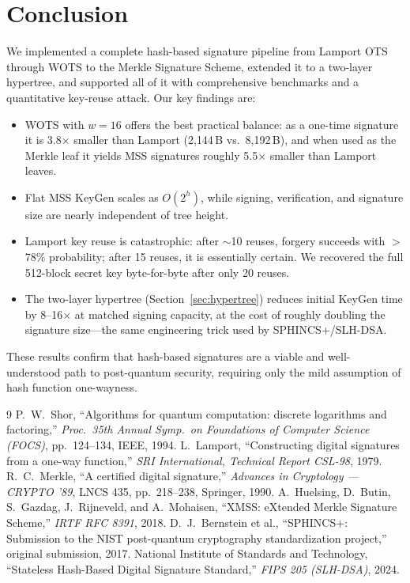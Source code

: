 \documentclass[10pt,a4paper,twocolumn]{article}
\begin{document}
\section{Conclusion}

We implemented a complete hash-based signature pipeline from Lamport OTS through WOTS to the Merkle Signature Scheme, extended it to a two-layer hypertree, and supported all of it with comprehensive benchmarks and a quantitative key-reuse attack. Our key findings are:

\begin{itemize}
    \item WOTS with $w\!=\!16$ offers the best practical balance: as a one-time signature it is 3.8$\times$ smaller than Lamport (2{,}144\,B vs.\ 8{,}192\,B), and when used as the Merkle leaf it yields MSS signatures roughly 5.5$\times$ smaller than Lamport leaves.
    \item Flat MSS KeyGen scales as $O(2^h)$, while signing, verification, and signature size are nearly independent of tree height.
    \item Lamport key reuse is catastrophic: after $\sim$10 reuses, forgery succeeds with $>$78\% probability; after 15 reuses, it is essentially certain. We recovered the full 512-block secret key byte-for-byte after only 20 reuses.
    \item The two-layer hypertree (Section~\ref{sec:hypertree}) reduces initial KeyGen time by 8--16$\times$ at matched signing capacity, at the cost of roughly doubling the signature size---the same engineering trick used by SPHINCS+/SLH-DSA.
\end{itemize}

These results confirm that hash-based signatures are a viable and well-understood path to post-quantum security, requiring only the mild assumption of hash function one-wayness.

\begin{thebibliography}{9}
 P.~W.~Shor, ``Algorithms for quantum computation: discrete logarithms and factoring,'' \emph{Proc.\ 35th Annual Symp.\ on Foundations of Computer Science (FOCS)}, pp.~124--134, IEEE, 1994.
 L.~Lamport, ``Constructing digital signatures from a one-way function,'' \emph{SRI International, Technical Report CSL-98}, 1979.
 R.~C.~Merkle, ``A certified digital signature,'' \emph{Advances in Cryptology --- CRYPTO '89}, LNCS 435, pp.~218--238, Springer, 1990.
 A.~Huelsing, D.~Butin, S.~Gazdag, J.~Rijneveld, and A.~Mohaisen, ``XMSS: eXtended Merkle Signature Scheme,'' \emph{IRTF RFC 8391}, 2018.
 D.~J.\ Bernstein et al., ``SPHINCS+: Submission to the NIST post-quantum cryptography standardization project,'' original submission, 2017.
 National Institute of Standards and Technology, ``Stateless Hash-Based Digital Signature Standard,'' \emph{FIPS 205 (SLH-DSA)}, 2024.
\end{thebibliography}
\end{document}
